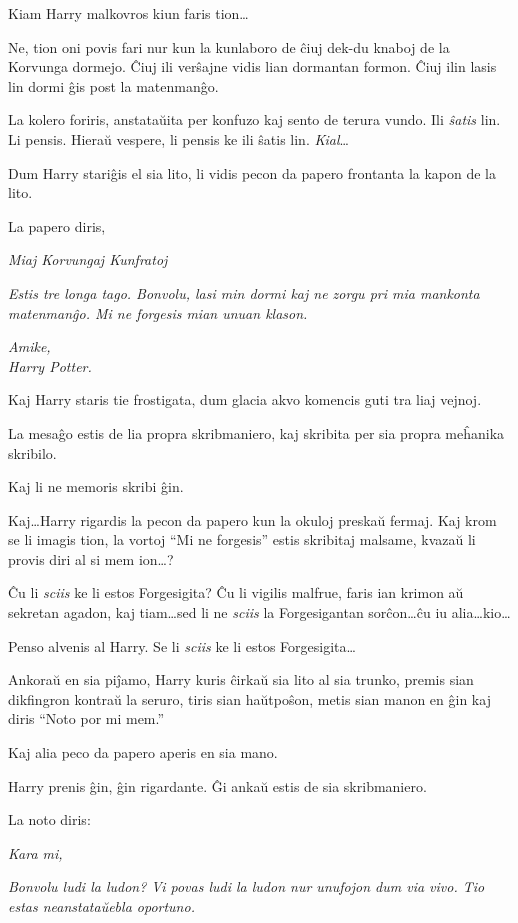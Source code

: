 Kiam Harry malkovros kiun faris tion\ldots

Ne, tion oni povis fari nur kun la kunlaboro de ĉiuj dek-du knaboj
de la Korvunga dormejo. Ĉiuj ili verŝajne vidis lian dormantan
formon. Ĉiuj ilin lasis lin dormi ĝis post la matenmanĝo.

La kolero foriris, anstataŭita per konfuzo kaj sento de terura vundo.
Ili \emph{ŝatis} lin. Li pensis. Hieraŭ vespere, li pensis ke ili
ŝatis lin. \emph{Kial}\ldots

Dum Harry stariĝis el sia lito, li vidis pecon da papero frontanta la
kapon de la lito.

La papero diris,
\medskip

\emph{Miaj Korvungaj Kunfratoj}

\emph{Estis tre longa tago. Bonvolu, lasi min dormi kaj ne zorgu pri
  mia mankonta matenmanĝo. Mi ne forgesis mian unuan klason.}

\emph{Amike,\\
  Harry Potter.
}
\medskip

Kaj Harry staris tie frostigata, dum glacia akvo komencis guti tra
liaj vejnoj.

La mesaĝo estis de lia propra skribmaniero, kaj skribita per sia
propra meĥanika skribilo.

Kaj li ne memoris skribi ĝin.

Kaj\ldots Harry rigardis la pecon da papero kun la okuloj preskaŭ fermaj. Kaj
krom se li imagis tion, la vortoj ``Mi ne forgesis'' estis skribitaj malsame,
kvazaŭ li provis diri al si mem ion\ldots?

Ĉu li \emph{sciis} ke li estos Forgesigita? Ĉu li vigilis malfrue, faris
ian krimon aŭ sekretan agadon, kaj tiam\ldots sed li ne \emph{sciis}
la Forgesigantan sorĉon\ldots ĉu iu alia\ldots kio\ldots

Penso alvenis al Harry. Se li \emph{sciis} ke li estos
Forgesigita\ldots

Ankoraŭ en sia piĵamo, Harry kuris ĉirkaŭ sia lito al sia trunko,
premis sian dikfingron kontraŭ la seruro, tiris sian haŭtpoŝon, metis
sian manon en ĝin kaj diris ``Noto por mi mem.''

Kaj alia peco da papero aperis en sia mano.

Harry prenis ĝin, ĝin rigardante. Ĝi ankaŭ estis de sia skribmaniero.

La noto diris:
\medskip

\emph{Kara mi,}

\emph{Bonvolu ludi la ludon? Vi povas ludi la ludon nur unufojon dum
  via vivo. Tio estas neanstataŭebla oportuno.}

